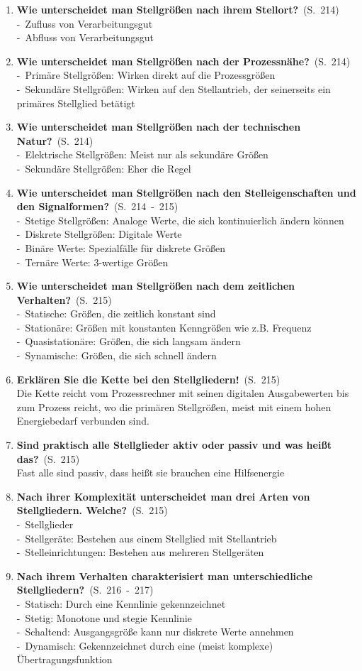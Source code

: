 \documentclass[a4paper,12pt]{article}
\newcommand{\question}[3]{\pagebreak[3]\item {\textbf{#1?}}\ (S.\ #2)#3}
\newcommand{\statement}[3]{\pagebreak[3]\item {\textbf{#1!}}\ (S.\ #2)#3}
\newcommand{\catchword}[1]{\\-\ #1}
\newcommand{\normaltext}[1]{\\#1}
\newcommand{\page}[1]{#1}
\newcommand{\pages}[2]{#1\ -\ #2}
\begin{document}
\begin{enumerate}
  \question{Wie unterscheidet man Stellgrößen nach ihrem Stellort}{\page{214}}
  {
    \catchword{Zufluss von Verarbeitungsgut}
    \catchword{Abfluss von Verarbeitungsgut}
  }

  \question{Wie unterscheidet man Stellgrößen nach der Prozessnähe}{\page{214}}
  {
    \catchword{Primäre Stellgrößen: Wirken direkt auf die Prozessgrößen}
    \catchword{Sekundäre Stellgrößen: Wirken auf den Stellantrieb, der seinerseits
               ein primäres Stellglied betätigt}
  }

  \question{Wie unterscheidet man Stellgrößen nach der technischen Natur}{\page{214}}
  {
    \catchword{Elektrische Stellgrößen: Meist nur als sekundäre Größen}
    \catchword{Sekundäre Stellgrößen: Eher die Regel}
  }

  \question{Wie unterscheidet man Stellgrößen nach den Stelleigenschaften
            und den Signalformen}{\pages{214}{215}}
  {
    \catchword{Stetige Stellgrößen: Analoge Werte, die sich kontinuierlich ändern können}
    \catchword{Diskrete Stellgrößen: Digitale Werte}
    \catchword{Binäre Werte: Spezialfälle für diskrete Größen}
    \catchword{Ternäre Werte: 3-wertige Größen}
  }

  \question{Wie unterscheidet man Stellgrößen nach dem zeitlichen Verhalten}{\page{215}}
  {
    \catchword{Statische: Größen, die zeitlich konstant sind}
    \catchword{Stationäre: Größen mit konstanten Kenngrößen wie z.B. Frequenz}
    \catchword{Quasistationäre: Größen, die sich langsam ändern}
    \catchword{Synamische: Größen, die sich schnell ändern}
  }

  \statement{Erklären Sie die Kette bei den Stellgliedern}{\page{215}}
  {
    \normaltext{Die Kette reicht vom Prozessrechner mit seinen digitalen Ausgabewerten
                bis zum Prozess reicht, wo die primären Stellgrößen, meist mit einem hohen
                Energiebedarf verbunden sind.}
  }

  \question{Sind praktisch alle Stellglieder aktiv oder passiv und was heißt das}{\page{215}}
  {
    \normaltext{Fast alle sind passiv, dass heißt sie brauchen eine Hilfsenergie}
  }

  \question{Nach ihrer Komplexität unterscheidet man drei Arten von Stellgliedern. Welche}{\page{215}}
  {
    \catchword{Stellglieder}
    \catchword{Stellgeräte: Bestehen aus einem Stellglied mit Stellantrieb}
    \catchword{Stelleinrichtungen: Bestehen aus mehreren Stellgeräten}
  }

  \question{Nach ihrem Verhalten charakterisiert man unterschiedliche Stellgliedern}{\pages{216}{217}}
  {
    \catchword{Statisch: Durch eine Kennlinie gekennzeichnet}
    \catchword{Stetig: Monotone und stegie Kennlinie}
    \catchword{Schaltend: Ausgangsgröße kann nur diskrete Werte annehmen}
    \catchword{Dynamisch: Gekennzeichnet durch eine (meist komplexe) Übertragungsfunktion}
  }


\end{enumerate}
\end{document}
